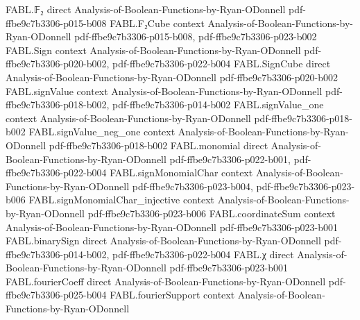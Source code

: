 \begin{theorem}
\label{FABL.majorityThreeDeterministicRandomizedTree_averageCost}
\leanok
{}
\proofstep
  {FABL.𝔽₂}
  {direct}
  {Analysis-of-Boolean-Functions-by-Ryan-ODonnell}
  {pdf-ffbe9c7b3306-p015-b008}
\proofstep
  {FABL.F₂Cube}
  {context}
  {Analysis-of-Boolean-Functions-by-Ryan-ODonnell}
  {pdf-ffbe9c7b3306-p015-b008,
    pdf-ffbe9c7b3306-p023-b002}
\proofstep
  {FABL.Sign}
  {context}
  {Analysis-of-Boolean-Functions-by-Ryan-ODonnell}
  {pdf-ffbe9c7b3306-p020-b002,
    pdf-ffbe9c7b3306-p022-b004}
\proofstep
  {FABL.SignCube}
  {direct}
  {Analysis-of-Boolean-Functions-by-Ryan-ODonnell}
  {pdf-ffbe9c7b3306-p020-b002}
\proofstep
  {FABL.signValue}
  {context}
  {Analysis-of-Boolean-Functions-by-Ryan-ODonnell}
  {pdf-ffbe9c7b3306-p018-b002,
    pdf-ffbe9c7b3306-p014-b002}
\proofstep
  {FABL.signValue_one}
  {context}
  {Analysis-of-Boolean-Functions-by-Ryan-ODonnell}
  {pdf-ffbe9c7b3306-p018-b002}
\proofstep
  {FABL.signValue_neg_one}
  {context}
  {Analysis-of-Boolean-Functions-by-Ryan-ODonnell}
  {pdf-ffbe9c7b3306-p018-b002}
\proofstep
  {FABL.monomial}
  {direct}
  {Analysis-of-Boolean-Functions-by-Ryan-ODonnell}
  {pdf-ffbe9c7b3306-p022-b001,
    pdf-ffbe9c7b3306-p022-b004}
\proofstep
  {FABL.signMonomialChar}
  {context}
  {Analysis-of-Boolean-Functions-by-Ryan-ODonnell}
  {pdf-ffbe9c7b3306-p023-b004,
    pdf-ffbe9c7b3306-p023-b006}
\proofstep
  {FABL.signMonomialChar_injective}
  {context}
  {Analysis-of-Boolean-Functions-by-Ryan-ODonnell}
  {pdf-ffbe9c7b3306-p023-b006}
\proofstep
  {FABL.coordinateSum}
  {context}
  {Analysis-of-Boolean-Functions-by-Ryan-ODonnell}
  {pdf-ffbe9c7b3306-p023-b001}
\proofstep
  {FABL.binarySign}
  {direct}
  {Analysis-of-Boolean-Functions-by-Ryan-ODonnell}
  {pdf-ffbe9c7b3306-p014-b002,
    pdf-ffbe9c7b3306-p022-b004}
\proofstep
  {FABL.χ}
  {direct}
  {Analysis-of-Boolean-Functions-by-Ryan-ODonnell}
  {pdf-ffbe9c7b3306-p023-b001}
\proofstep
  {FABL.fourierCoeff}
  {direct}
  {Analysis-of-Boolean-Functions-by-Ryan-ODonnell}
  {pdf-ffbe9c7b3306-p025-b004}
\proofstep
  {FABL.fourierSupport}
  {context}
  {Analysis-of-Boolean-Functions-by-Ryan-ODonnell}

\end{theorem}
